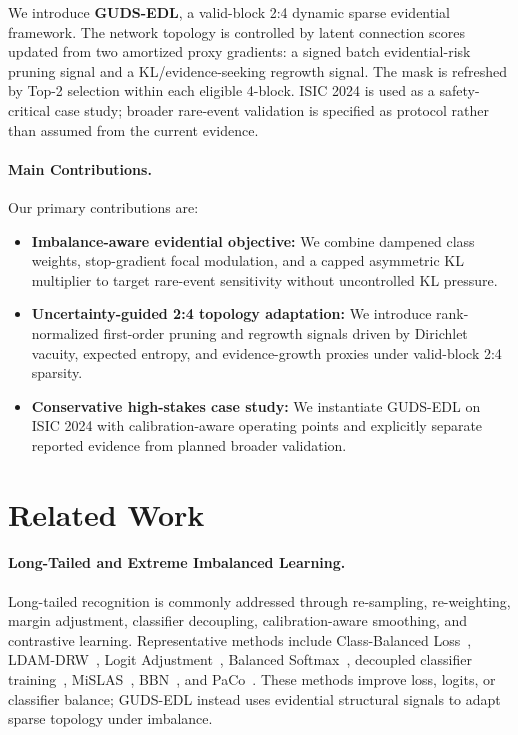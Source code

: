 \documentclass[letterpaper]{article} %
\begin{document}
We introduce \textbf{GUDS-EDL}, a valid-block 2:4 dynamic sparse evidential framework. The network topology is controlled by latent connection scores updated from two amortized proxy gradients: a signed batch evidential-risk pruning signal and a KL/evidence-seeking regrowth signal. The mask is refreshed by Top-2 selection within each eligible 4-block. ISIC 2024 is used as a safety-critical case study; broader rare-event validation is specified as protocol rather than assumed from the current evidence.

\paragraph{Main Contributions.} Our primary contributions are:
\begin{itemize}
    \item \textbf{Imbalance-aware evidential objective:} We combine dampened class weights, stop-gradient focal modulation, and a capped asymmetric KL multiplier to target rare-event sensitivity without uncontrolled KL pressure.
    \item \textbf{Uncertainty-guided 2:4 topology adaptation:} We introduce rank-normalized first-order pruning and regrowth signals driven by Dirichlet vacuity, expected entropy, and evidence-growth proxies under valid-block 2:4 sparsity.
    \item \textbf{Conservative high-stakes case study:} We instantiate GUDS-EDL on ISIC 2024 with calibration-aware operating points and explicitly separate reported evidence from planned broader validation.
\end{itemize}

\section{Related Work}\label{sec:related}

\paragraph{Long-Tailed and Extreme Imbalanced Learning.} Long-tailed recognition is commonly addressed through re-sampling, re-weighting, margin adjustment, classifier decoupling, calibration-aware smoothing, and contrastive learning. Representative methods include Class-Balanced Loss~\cite{cui2019class}, LDAM-DRW~\cite{cao2019learning}, Logit Adjustment~\cite{menon2021long}, Balanced Softmax~\cite{ren2020balanced}, decoupled classifier training~\cite{kang2019decoupling}, MiSLAS~\cite{zhong2021improving}, BBN~\cite{zhou2020bbn}, and PaCo~\cite{cui2021parametric}. These methods improve loss, logits, or classifier balance; GUDS-EDL instead uses evidential structural signals to adapt sparse topology under imbalance.
\end{document}
